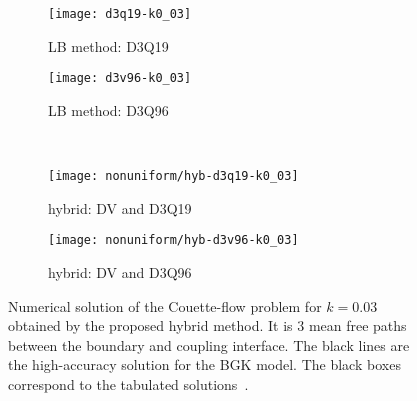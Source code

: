 \documentclass[]{elsarticle} %
\begin{document}
\begin{figure}
    \centering
    \begin{subfigure}[b]{0.5\textwidth}
        \texttt{[image: d3q19-k0\_03]}
        \caption{LB method: D3Q19}
        \label{fig:d3q19-k003}
    \end{subfigure}%
    \begin{subfigure}[b]{0.5\textwidth}
        \texttt{[image: d3v96-k0\_03]}
        \caption{LB method: D3Q96}
        \label{fig:d3v96-k003}
    \end{subfigure}\\
    \begin{subfigure}[b]{0.5\textwidth}
        \texttt{[image: nonuniform/hyb-d3q19-k0\_03]}
        \caption{hybrid: DV and D3Q19}
        \label{fig:hyb:d3q19-k003}
    \end{subfigure}%
    \begin{subfigure}[b]{0.5\textwidth}
        \texttt{[image: nonuniform/hyb-d3v96-k0\_03]}
        \caption{hybrid: DV and D3Q96}
        \label{fig:hyb:d3v96-k003}
    \end{subfigure}
    \caption{
        Numerical solution of the Couette-flow problem for \(k=0.03\) obtained by the proposed hybrid method.
        It is \(3\) mean free paths between the boundary and coupling interface.
        The black lines are the high-accuracy solution for the BGK model.
        The black boxes correspond to the tabulated solutions~\cite{Luo2016}.
    }\label{fig:hybrid-k003}
\end{figure}
\end{document}
